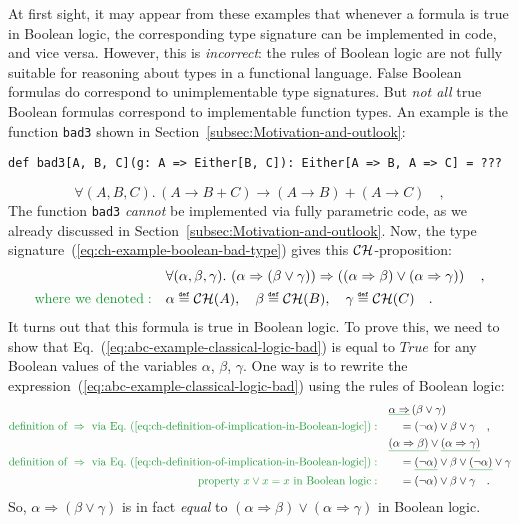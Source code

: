 At first sight, it may appear from these examples that whenever a
formula is true in Boolean logic, the corresponding type signature
can be implemented in code, and vice versa. However, this is \emph{incorrect}:
the rules of Boolean logic are not fully suitable for reasoning about
types in a functional language. False Boolean formulas do correspond
to unimplementable type signatures. But \emph{not all} true Boolean
formulas correspond to implementable function types. An example is
the function \lstinline!bad3! shown in Section~\ref{subsec:Motivation-and-outlook}:
\begin{lstlisting}
def bad3[A, B, C](g: A => Either[B, C]): Either[A => B, A => C] = ???
\end{lstlisting}
\begin{equation}
\forall(A,B,C).\,\left(A\rightarrow B+C\right)\rightarrow\left(A\rightarrow B\right)+\left(A\rightarrow C\right)\quad,\label{eq:ch-example-boolean-bad-type}
\end{equation}
The function \lstinline!bad3! \emph{cannot} be implemented via fully
parametric code, as we already discussed in Section~\ref{subsec:Motivation-and-outlook}.
Now, the type signature~(\ref{eq:ch-example-boolean-bad-type}) gives
this  ${\cal CH}$-proposition:
\begin{align}
 & \forall(\alpha,\beta,\gamma).\,\left(\alpha\Rightarrow\left(\beta\vee\gamma\right)\right)\Rightarrow\left(\left(\alpha\Rightarrow\beta\right)\vee\left(\alpha\Rightarrow\gamma\right)\right)\quad,\label{eq:abc-example-classical-logic-bad}\\
{\color{greenunder}\text{where we denoted}:}\quad & \alpha\triangleq{\cal CH}(A),\quad\beta\triangleq{\cal CH}(B),\quad\gamma\triangleq{\cal CH}(C)\quad.\nonumber 
\end{align}
It turns out that this formula is true in Boolean logic. To prove
this, we need to show that Eq.~(\ref{eq:abc-example-classical-logic-bad})
is equal to $True$ for any Boolean values of the variables $\alpha$,
$\beta$, $\gamma$. One way is to rewrite the expression~(\ref{eq:abc-example-classical-logic-bad})
using the rules of Boolean logic:
\begin{align*}
 & \gunderline{\alpha\Rightarrow}\left(\beta\vee\gamma\right)\\
{\color{greenunder}\text{definition of }\Rightarrow\text{ via Eq.~(\ref{eq:ch-definition-of-implication-in-Boolean-logic})}:}\quad & \quad=(\neg\alpha)\vee\beta\vee\gamma\quad,\\
 & \gunderline{\left(\alpha\Rightarrow\beta\right)}\vee\gunderline{\left(\alpha\Rightarrow\gamma\right)}\\
{\color{greenunder}\text{definition of }\Rightarrow\text{ via Eq.~(\ref{eq:ch-definition-of-implication-in-Boolean-logic})}:}\quad & \quad=\gunderline{(\neg\alpha)}\vee\beta\vee\gunderline{(\neg\alpha)}\vee\gamma\\
{\color{greenunder}\text{property }x\vee x=x\text{ in Boolean logic}:}\quad & \quad=(\neg\alpha)\vee\beta\vee\gamma\quad.
\end{align*}
So, $\alpha\Rightarrow(\beta\vee\gamma)$ is in fact \emph{equal}
to $\left(\alpha\Rightarrow\beta\right)\vee\left(\alpha\Rightarrow\gamma\right)$
in Boolean logic.

